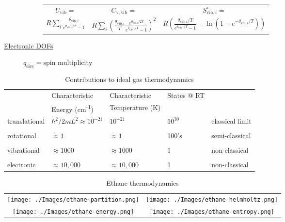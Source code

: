 \documentclass[11pt]{article}
\begin{document}
\begin{table}
\begin{center}
\begin{description}
\begin{description}
\begin{tabular}{ccc}
$ U_\mathrm{vib}= $ & $  C_\mathrm{v,vib} = $ & $S^\circ_{\mathrm{vib},i}=$ \\
$\displaystyle
R\sum_i\frac{\theta_{\mathrm{vib},i}}{e^{\theta_{\mathrm{vib},i}/T}-1}$ &
$\displaystyle R \sum_i \left (
  \frac{\theta_{\mathrm{vib},i}}{T}\frac{e^{\theta_{\mathrm{vib},i}/2T}}{e^{\theta_{\mathrm{vib},i}/T}-1}
\right )^2 $ & $\displaystyle R \left ( \frac{\theta_{\mathrm{vib},i}/T}{e^{\theta_{\mathrm{vib},i}/T}-1}
-\ln(1-e^{-\theta_{\mathrm{vib},i}/T})\right ) $ \\
\end{tabular}

\end{description}
\item[\underline{Electronic DOFs}] {}
$q_\mathrm{elec} = \text{spin multiplicity}$


\end{description}
\end{center}
\end{table}

\begin{table}[htbp]
\caption{Contributions to ideal gas thermodynamics}
\centering
\begin{tabular}{lllll}
\hline
 & Characteristic & Characteristic & States @ RT & \\
 & Energy (cm\textsuperscript{-1}) & Temperature (K) &  & \\
\hline
translational & \(\hbar^2/2 m L^2 \approx 10^{-21}\) & \(10^{-21}\) & \(10^{30}\) & classical limit\\
 &  &  &  & \\
rotational & \(\approx 1\) & \(\approx 1\) & 100's & semi-classical\\
 &  &  &  & \\
vibrational & \(\approx 1000\) & \(\approx 1000\) & 1 & non-classical\\
 &  &  &  & \\
electronic & \(\approx 10,000\) & \(\approx 10,000\) & 1 & non-classical\\
\hline
\end{tabular}
\end{table}

\begin{table}
   \caption{Ethane thermodynamics}
\begin{tabular}{cc}
\texttt{[image: ./Images/ethane-partition.png]} & \texttt{[image: ./Images/ethane-helmholtz.png]} \\
\texttt{[image: ./Images/ethane-energy.png]} & 
\texttt{[image: ./Images/ethane-entropy.png]}
\end{tabular}
\end{table}
\end{document}
